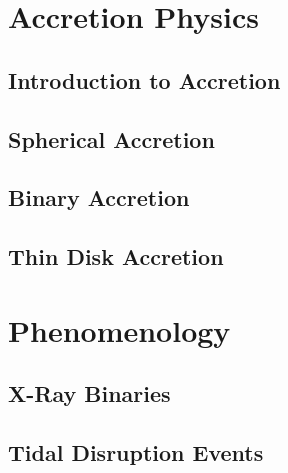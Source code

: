 \documentclass[11pt,fleqn]{book} %
\begin{document}
\part{Accretion Physics}
\chapter{Introduction to Accretion}

\chapter{Spherical Accretion}

\chapter{Binary Accretion}

\chapter{Thin Disk Accretion}


\part{Phenomenology}
\chapter{X-Ray Binaries}

\chapter{Tidal Disruption Events}



\end{document}
